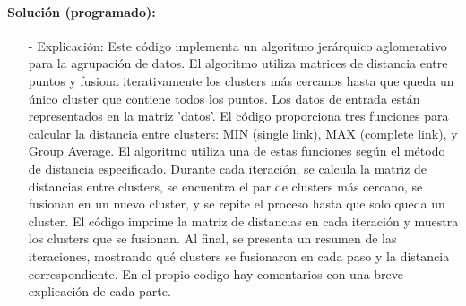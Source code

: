 \documentclass[a4paper, 12pt]{article}
\begin{document}
	\paragraph{Solución (programado):}
	
	\begin{itemize}
	  \item[-] Explicación:
	Este código implementa un algoritmo jerárquico aglomerativo para la agrupación de datos. El algoritmo utiliza matrices de distancia entre puntos y fusiona iterativamente los clusters más cercanos hasta que queda un único cluster que contiene todos los puntos. Los datos de entrada están representados en la matriz 'datos'. El código proporciona tres funciones para calcular la distancia entre clusters: MIN (single link), MAX (complete link), y Group Average. El algoritmo utiliza una de estas funciones según el método de distancia especificado. Durante cada iteración, se calcula la matriz de distancias entre clusters, se encuentra el par de clusters más cercano, se fusionan en un nuevo cluster, y se repite el proceso hasta que solo queda un cluster. El código imprime la matriz de distancias en cada iteración y muestra los clusters que se fusionan. Al final, se presenta un resumen de las iteraciones, mostrando qué clusters se fusionaron en cada paso y la distancia correspondiente.
	En el propio codigo hay comentarios con una breve explicación de cada parte.
	\end{itemize}
\end{document}

